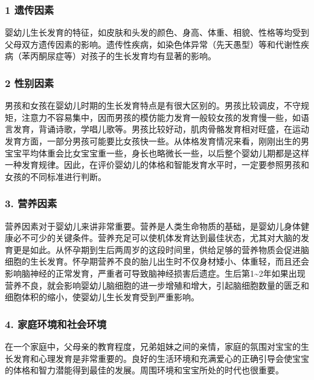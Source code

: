 \documentclass[
]{article}
\begin{document}
\hypertarget{ux9057ux4f20ux56e0ux7d20}{%
\subsubsection{1 遗传因素}\label{ux9057ux4f20ux56e0ux7d20}}

婴幼儿生长发育的特征，如皮肤和头发的颜色、身高、体重、相貌、性格等均受到父母双方遗传因素的影响。遗传性疾病，如染色体异常（先天愚型）等和代谢性疾病（苯丙酮尿症等）对孩子的生长发育均有显著的影响。

\hypertarget{ux6027ux522bux56e0ux7d20}{%
\subsubsection{2 性别因素}\label{ux6027ux522bux56e0ux7d20}}

男孩和女孩在婴幼儿时期的生长发育特点是有很大区别的。男孩比较调皮，不守规矩，注意力不容易集中，因而男孩的模仿能力发育一般较女孩的发育慢一些，如语言发育，背诵诗歌，学唱儿歌等。男孩比较好动，肌肉骨骼发育相对旺盛，在运动发育方面，一部分男孩可能要比女孩快一些。从体格发育情况来看，刚刚出生的男宝宝平均体重会比女宝宝重一些，身长也略微长一些，以后整个婴幼儿期都是这样一种发育规律。因此，在评价婴幼儿的体格和智能发育水平时，一定要参照男孩和女孩的不同标准进行判断。

\hypertarget{ux8425ux517bux56e0ux7d20}{%
\subsubsection{3. 营养因素}\label{ux8425ux517bux56e0ux7d20}}

营养因素对于婴幼儿来讲非常重要。营养是人类生命物质的基础，是婴幼儿身体健康必不可少的关键条件。营养充足可以使机体发育达到最佳状态，尤其对大脑的发育更是如此。从怀孕期到生后两周岁的这段时间里，供给足够的营养物质会促进脑细胞的生长发育。怀孕期营养不良的胎儿出生时不仅身材矮小、体重轻，而且还会影响脑神经的正常发育，严重者可导致脑神经损害后遗症。生后第1\textasciitilde2年如果出现营养不良，就会影响婴幼儿脑细胞的进一步增殖和增大，引起脑细胞数量的匮乏和细胞体积的缩小，使婴幼儿生长发育受到严重影响。

\hypertarget{ux5bb6ux5eadux73afux5883ux548cux793eux4f1aux73afux5883}{%
\subsubsection{4.
家庭环境和社会环境}\label{ux5bb6ux5eadux73afux5883ux548cux793eux4f1aux73afux5883}}

在一个家庭中，父母亲的教育程度，兄弟姐妹之间的亲情，家庭的氛围对宝宝的生长发育和心理发育是非常重要的。良好的生活环境和充满爱心的正确引导会使宝宝的体格和智力潜能得到最佳的发展。周围环境和宝宝所处的时代也很重要。
\end{document}
